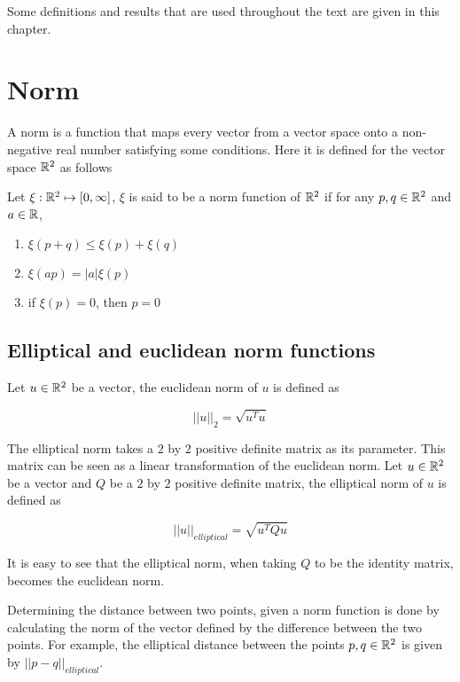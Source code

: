 Some definitions and results that are used throughout the text are given in this chapter.

\section{Norm}

A norm is a function that maps every vector from a vector space onto a non-negative real number satisfying some conditions. Here it is defined for the vector space $\mathbb{R}^2$ as follows

\begin{definicao}
Let $\xi : \mathbb{R}^2 \mapsto [0, \infty]$, $\xi$ is said to be a norm function of $\mathbb{R}^2$ if for any $p, q \in \mathbb{R}^2$ and $a \in \mathbb{R}$,

\begin{enumerate}
    \item $\xi(p + q) \le \xi(p) + \xi(q)$
    \item $\xi(ap) = |a|\xi(p)$
    \item if $\xi(p)=0$, then $p=0$
\end{enumerate}

\end{definicao}

\subsection{Elliptical and euclidean norm functions}

Let $u \in \mathbb{R}^2$ be a vector, the euclidean norm of $u$ is defined as

\begin{equation}\label{eq:norm2}
||u||_2 = \sqrt{u^{T}u}
\end{equation}

The elliptical norm takes a $2$ by $2$ positive definite matrix as its parameter. This matrix can be seen as a linear transformation of the euclidean norm. Let $u \in \mathbb{R}^2$ be a vector and $Q$ be a $2$ by $2$ positive definite matrix, the elliptical norm of $u$ is defined as 

\begin{equation}
||u||_{elliptical} = \sqrt{u^{T}Qu}
\end{equation}

It is easy to see that the elliptical norm, when taking $Q$ to be the identity matrix, becomes the euclidean norm.

Determining the distance between two points, given a norm function is done by calculating the norm of the vector defined by the difference between the two points. For example, the elliptical distance between the points $p,q \in \mathbb{R}^2$ is given by $||p-q||_{elliptical}$.

